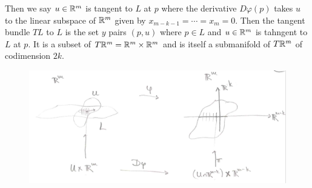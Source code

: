 Then we say $u \in \mathbb{R}^m$ is tangent to $L$ at $p$ where the derivative $D\varphi(p)$
takes $u$ to the linear subspace of $\mathbb{R}^m$ given by $x_{m-k-1} = \cdots = x_m = 0$.
Then the tangent bundle $TL$ to $L$ is the set $y$ pairs $(p,u)$ where $p \in L$ and 
$u \in \mathbb{R}^m$ is tahngent to $L$ at $p$. It is a subset of $T \mathbb{R}^m=\mathbb{R}^m \times \mathbb{R}^m$ 
and is itself a submanifold of $T \mathbb{R}^m$ of codimension $2k$.

\begin{figure}
\includegraphics[width=\textwidth]{im/02-00-p28-pic}
\end{figure}





